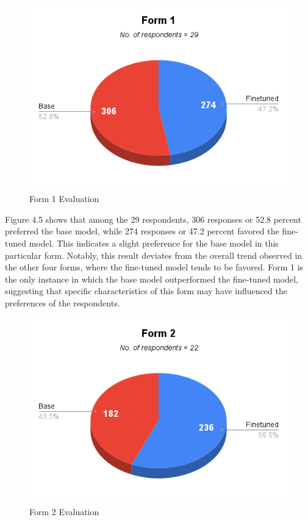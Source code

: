 \begin{figure}[H]
	\caption{Form 1 Evaluation}
	\centering
	\includegraphics[scale=0.7]{figures/Form1.png}
\end{figure}

Figure 4.5 shows that among the 29 respondents, 306 responses or 52.8 percent preferred the base model, while 274 responses or 47.2 percent favored the fine-tuned model. This indicates a slight preference for the base model in this particular form. Notably, this result deviates from the overall trend observed in the other four forms, where the fine-tuned model tends to be favored. Form 1 is the only instance in which the base model outperformed the fine-tuned model, suggesting that specific characteristics of this form may have influenced the preferences of the respondents. 


\begin{figure}[H]
	\caption{Form 2 Evaluation}
	\centering
	\includegraphics[scale=0.7]{figures/Form2.png}
\end{figure}

